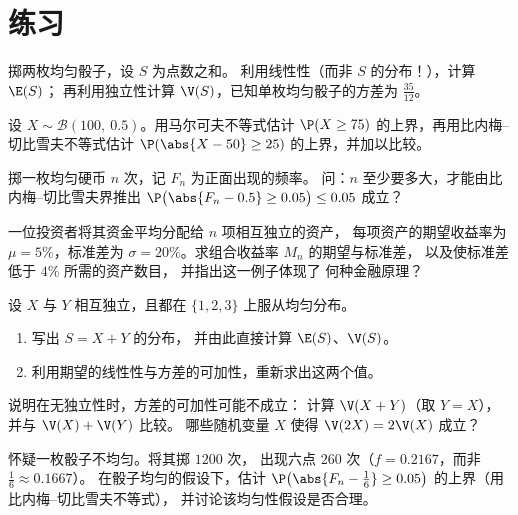\section{练习}

\begin{exercise}[$\star$]\label{exo:g12:sums:1}
掷两枚均匀骰子，设 $S$ 为点数之和。
利用线性性（而非 $S$ 的分布！），计算 $\E(S)$；
再利用独立性计算 $\V(S)$，已知单枚均匀骰子的方差为 $\frac{35}{12}$。
\end{exercise}

\begin{exercise}[$\star$]\label{exo:g12:sums:2}
设 $X \sim \mathcal B(100,\ 0.5)$。用马尔可夫不等式估计
$\P(X \geq 75)$ 的上界，再用比内梅–切比雪夫不等式估计
$\P(\abs{X - 50} \geq 25)$ 的上界，并加以比较。
\end{exercise}

\begin{exercise}[$\star$]\label{exo:g12:sums:3}
掷一枚均匀硬币 $n$ 次，记 $F_n$ 为正面出现的频率。
问：$n$ 至少要多大，才能由比内梅–切比雪夫界推出
$\P\bigl(\abs{F_n - 0.5} \geq 0.05\bigr) \leq 0.05$ 成立？
\end{exercise}

\begin{exercise}[$\star\star$]\label{exo:g12:sums:4}
一位投资者将其资金平均分配给 $n$ 项相互独立的资产，
每项资产的期望收益率为 $\mu = 5\%$，标准差为
$\sigma = 20\%$。求组合收益率 $M_n$ 的期望与标准差，
以及使标准差低于 $4\%$ 所需的资产数目，
并指出这一例子体现了
何种金融原理？
\end{exercise}

\begin{exercise}[$\star\star$]\label{exo:g12:sums:5}
设 $X$ 与 $Y$ 相互独立，且都在 $\{1, 2, 3\}$ 上服从均匀分布。
\begin{enumerate}
  \item 写出 $S = X + Y$ 的分布，
        并由此直接计算 $\E(S)$、$\V(S)$。
  \item 利用期望的线性性与方差的可加性，重新求出这两个值。
\end{enumerate}
\end{exercise}

\begin{exercise}[$\star\star$]\label{exo:g12:sums:6}
说明在无独立性时，方差的可加性可能不成立：
计算 $\V(X + Y)$（取 $Y = X$），并与 $\V(X) + \V(Y)$ 比较。
哪些随机变量 $X$ 使得 $\V(2X) = 2\V(X)$ 成立？
\end{exercise}

\begin{exercise}[$\star\star$]\label{exo:g12:sums:7}
怀疑一枚骰子不均匀。将其掷 $1200$ 次，
出现六点 $260$ 次（$f = 0.2167$，而非 $\frac16 \approx 0.1667$）。
在骰子均匀的假设下，估计
$\P\bigl(\abs{F_n - \frac16} \geq 0.05\bigr)$ 的上界（用比内梅–切比雪夫不等式），
并讨论该均匀性假设是否合理。
\end{exercise}

